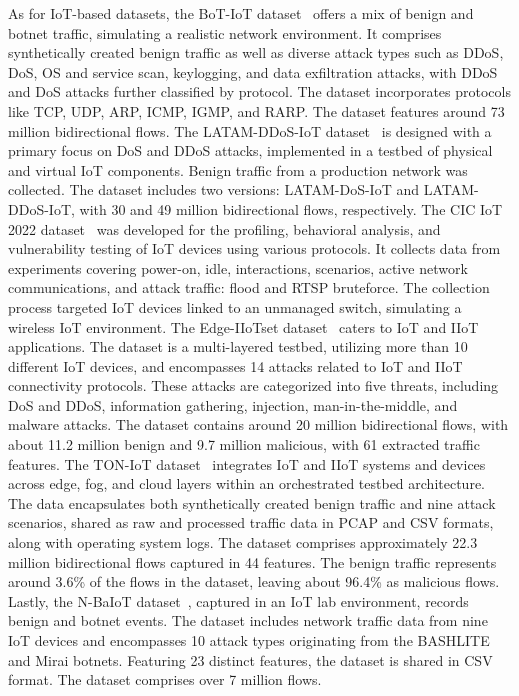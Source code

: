 \documentclass[lettersize,journal]{IEEEtran}
\begin{document}
As for \ac{IoT}-based datasets, the BoT-IoT dataset~\cite{moustafaBotIoT} offers a mix of benign and botnet traffic, simulating a realistic network environment. It comprises synthetically created benign traffic as well as diverse attack types such as \ac{DDoS}, \ac{DoS}, \ac{OS} and service scan, keylogging, and data exfiltration attacks, with \ac{DDoS} and \ac{DoS} attacks further classified by protocol. The dataset incorporates protocols like \ac{TCP}, \ac{UDP}, \ac{ARP}, \ac{ICMP}, \ac{IGMP}, and \ac{RARP}. The dataset features around 73 million bidirectional flows. The LATAM-DDoS-IoT dataset~\cite{almaraz2022LATAM} is designed with a primary focus on \ac{DoS} and \ac{DDoS} attacks, implemented in a testbed of physical and virtual \ac{IoT} components. Benign traffic from a production network was collected. The dataset includes two versions: LATAM-DoS-IoT and LATAM-DDoS-IoT, with 30 and 49 million bidirectional flows, respectively. The CIC IoT 2022 dataset~\cite{dadkhah2022CICIoT} was developed for the profiling, behavioral analysis, and vulnerability testing of IoT devices using various protocols. It collects data from experiments covering power-on, idle, interactions, scenarios, active network communications, and attack traffic: flood and \ac{RTSP} bruteforce. The collection process targeted IoT devices linked to an unmanaged switch, simulating a wireless IoT environment. The Edge-IIoTset dataset~\cite{ferrag2022EdgeIoT} caters to \ac{IoT} and \ac{IIoT} applications. The dataset is a multi-layered testbed, utilizing more than 10 different \ac{IoT} devices, and encompasses 14 attacks related to \ac{IoT} and \ac{IIoT} connectivity protocols. These attacks are categorized into five threats, including \ac{DoS} and \ac{DDoS}, information gathering, injection, man-in-the-middle, and malware attacks. The dataset contains around 20 million bidirectional flows, with about 11.2 million benign and 9.7 million malicious, with 61 extracted traffic features. The TON-IoT dataset~\cite{moustafa2021TONIoT} integrates \ac{IoT} and \ac{IIoT} systems and devices across edge, fog, and cloud layers within an orchestrated testbed architecture. The data encapsulates both synthetically created benign traffic and nine attack scenarios, shared as raw and processed traffic data in \ac{PCAP} and \ac{CSV} formats, along with operating system logs. The dataset comprises approximately 22.3 million bidirectional flows captured in 44 features. The benign traffic represents around 3.6\% of the flows in the dataset, leaving about 96.4\% as malicious flows. Lastly, the N-BaIoT dataset~\cite{meidan2018Nbaiot}, captured in an \ac{IoT} lab environment, records benign and botnet events. The dataset includes network traffic data from nine \ac{IoT} devices and encompasses 10 attack types originating from the BASHLITE and Mirai botnets. Featuring 23 distinct features, the dataset is shared in \ac{CSV} format. The dataset comprises over 7 million flows.
\end{document}

